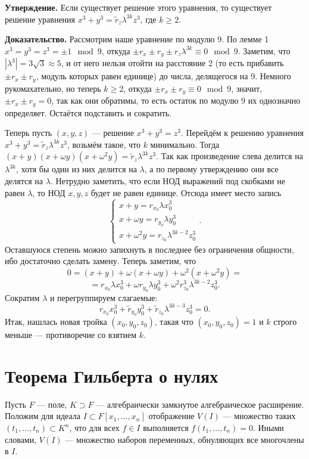 \textbf{Утверждение.} Если существует решение этого уравнения, то существует решение уравнения $x^3 + y^3 = \tilde r_z \lambda^{3k} z^3$, где $k \ge 2$.

\textbf{Доказательство.} Рассмотрим наше уравнение по модулю 9.
По лемме 1 $x^3 = y^3 = z^3 = \pm 1 \mod 9$, откуда $\pm r_x \pm r_y \pm r_z \lambda^{3k} \equiv 0 \mod 9$.
Заметим, что $|\lambda^3| = 3 \sqrt 3 \approx 5$, и от него нельзя отойти на расстояние 2 (то есть прибавить $\pm r_x \pm r_y$, модуль которых равен единице) до числа, делящегося на 9.
Немного рукомахательно, но теперь $k \ge 2$, откуда $\pm r_x \pm r_y \equiv 0 \mod 9$, значит, $\pm r_x \pm r_y = 0$, так как они обратимы, то есть остаток по модулю 9 их однозначно определяет.
Остаётся подставить и сократить.

\QED

Теперь пусть $(x, y, z)$ --- решение $x^3 + y^3 = z^3$.
Перейдём к решению уравнения $x^3 + y^3 = \tilde r_z \lambda^{3k} z^3$, возьмём такое, что $k$ минимально.
Тогда $(x + y)(x + \omega y)(x + \omega^2 y) = \tilde r_z \lambda^{3k} z^3$.
Так как произведение слева делится на $\lambda^{3k}$, хотя бы один из них делится на $\lambda$, а по первому утверждению они все делятся на $\lambda$.
Нетрудно заметить, что если НОД выражений под скобками не равен $\lambda$, то НОД $x, y, z$ будет не равен единице.
Отсюда имеет место запись
\[
    \begin{cases}
        x + y = r_{x_0} \lambda x_0^3 \\
        x + \omega y = r_{y_0} \lambda y_0^3 \\
        x + \omega^2 y = r_{z_0} \lambda^{3k - 2} z_0^3
    \end{cases} .
\]
Оставшуюся степень можно запихнуть в последнее без ограничения общности, ибо достаточно сделать замену.
Теперь заметим, что
\[
    0 = (x + y) + \omega(x + \omega y) + \omega^2(x + \omega^2 y) =
\]
\[
    = r_{x_0} \lambda x_0^3 + \omega r_{y_0} \lambda y_0^3 + \omega^2 r_{z_0}^3 \lambda^{3k - 2} z_0^3.
\]
Сократим $\lambda$ и перегруппируем слагаемые:
\[
    r_{x_0} x_0^3 + \tilde r_{y_0} y_0^3 + \tilde r_{z_0} \lambda^{3k - 3} z_0^3 = 0.
\]
Итак, нашлась новая тройка $(x_0, y_0, z_0)$, такая что $(x_0, y_0, z_0) = 1$ и $k$ строго меньше --- противоречие со взятием $k$.

\QED

\section{Теорема Гильберта о нулях}
Пусть $F$ --- поле, $K \supset F$ --- алгебраически замкнутое алгебраическое расширение.
Положим для идеала $I \subset F[x_1, \dots, x_n]$ отображение $V(I)$ --- множество таких $(t_1, \dots, t_n) \subset K^n$, что для всех $f \in I$ выполняется $f(t_1, \dots, t_n) = 0$.
Иными словами, $V(I)$ --- множество наборов переменных, обнуляющих все многочлены в $I$.

